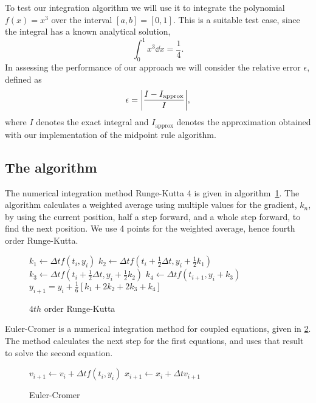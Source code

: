 \documentclass[english,notitlepage,reprint,nofootinbib]{revtex4-1}  %
\begin{document}
	To test our integration algorithm we will use it to integrate the polynomial $f(x) = x^3$ over the interval $[a,b] = [0,1]$. This is a suitable test case, since the integral has a known analytical solution,
	\begin{equation}
		\int_0^1 x^3 \dd x = \frac{1}{4}.
	\end{equation}
	In assessing the performance of our approach we will consider the relative error $\epsilon$, defined as
	\begin{equation}
		\epsilon = \abs{ \frac{I - I_{\text{approx}}}{I} },
	\end{equation}
	where $I$ denotes the exact integral and $I_\text{approx}$ denotes the approximation obtained with our implementation of the midpoint rule algorithm.
	
	
\subsection*{The algorithm}
%
The numerical integration method Runge-Kutta 4 is given in algorithm~\ref{algo:rk4}. The algorithm calculates a weighted average using multiple values for the gradient, $k_n$, by using the current position, half a step forward, and a whole step forward, to find the next position. We use 4 points for the weighted average, hence fourth order Runge-Kutta.

%
\begin{figure}
	\begin{algorithm}[H]
		\caption{$4th$ order Runge-Kutta}
		\label{algo:rk4}
		\begin{algorithmic}
			\State $k_1 \leftarrow \Delta t f(t_i, y_i)$  
			\State $k_2 \leftarrow \Delta t f(t_i + \frac{1}{2}\Delta t, y_i + \frac{1}{2}k_1)$
			\State $k_3 \leftarrow \Delta t f(t_i + \frac{1}{2}\Delta t, y_i + \frac{1}{2}k_2) $
			\State $k_4 \leftarrow \Delta t f(t_{i+1}, y_i + k_3)$
			\State $y_{i+1} = y_i + \frac{1}{6}[k_1 + 2k_2 + 2k_3 + k_4]$
			\EndProcedure
		\end{algorithmic}
	\end{algorithm}
\end{figure}
Euler-Cromer is a numerical integration method for coupled equations, given in \ref{algo:ec}. The method calculates the next step for the first equations, and uses that result to solve the second equation.
\begin{figure}
	\begin{algorithm}[H]
		\caption{Euler-Cromer}
		\label{algo:ec}
		\begin{algorithmic}
			\Procedure{EC}{$v, x, \Delta t, f$}
			\State $v_{i+1} \leftarrow v_i + \Delta t f(t_i, y_i)$
			\State $x_{i+1} \leftarrow x_i + \Delta t v_{i+1}$
			\EndProcedure
		\end{algorithmic}
	\end{algorithm}
\end{figure}
\end{document}

